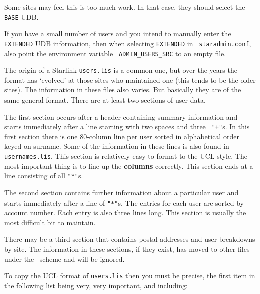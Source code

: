 Some sites may feel this is too much work. In that case, they should
select the {\tt BASE} UDB.

If you have a small number of users and you intend to manually enter the
{\tt EXTENDED} UDB information, then when selecting {\tt EXTENDED} in {\tt
staradmin.conf}, also point the environment variable {\tt
ADMIN\_USERS\_SRC} to an empty file.

The origin of a Starlink {\tt users.lis} is a common one, but over the
years the format has `evolved' at those sites who maintained one (this
tends to be the older sites). The information in these files also varies.
But basically they are of the same general format. There are at least two
sections of user data.

The first section occurs after a header containing summary information and
starts immediately after a line starting with two spaces and three {\tt
"+"}s. In this first section there is one 80-column line per user sorted
in alphabetical order keyed on surname. Some of the information in these
lines is also found in {\tt usernames.lis}. This section is relatively
easy to format to the UCL style. The most important thing is to line up
the {\bf columns} correctly. This section ends at a line consisting of all
{\tt "*"}s.

The second section contains further information about a particular user
and starts immediately after a line of {\tt "*"}s. The entries for each
user are sorted by account number. Each entry is also three lines long.
This section is usually the most difficult bit to maintain.

There may be a third section that contains postal addresses and user
breakdowns by site. The information in these sections, if they exist, has
moved to other files under the \staradmin\ scheme and will be ignored.

To copy the UCL format of {\tt users.lis} then you must be precise, the
first item in the following list being very, very important, and
including:


